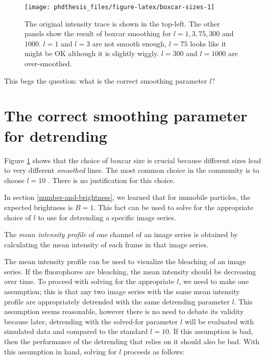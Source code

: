 \documentclass[12pt,]{book}
\theoremstyle{definition}
\theoremstyle{definition}
\theoremstyle{definition}
\theoremstyle{remark}
\let\BeginKnitrBlock\begin \let\EndKnitrBlock\end
\begin{document}
\begin{figure}

\texttt{[image: phdthesis\_files/figure-latex/boxcar-sizes-1]} \hfill{}

\caption{The original intensity trace is shown in the
top-left. The other panels show the result of boxcar smoothing for
\(l = 1, 3, 75, 300\) and \(1000\). \(l=1\) and \(l=3\) are not smooth
enough, \(l = 75\) looks like it might be OK although it is slightly
wiggly. \(l = 300\) and \(l = 1000\) are over-smoothed.}\label{fig:boxcar-sizes}
\end{figure}

This begs the question: what is the correct smoothing parameter \(l\)?

\section{The correct smoothing parameter for
detrending}\label{the-correct-smoothing-parameter-for-detrending}

Figure \ref{fig:boxcar-sizes} shows that the choice of boxcar size is
crucial because different sizes lead to very different \emph{smoothed}
lines. The most common choice in the community is to choose \(l = 10\)
\citep{SimFCS}. There is no justification for this choice.

In section \ref{number-and-brightness}, we learned that for immobile
particles, the expected brightness is \(B = 1\). This fact can be used
to solve for the appropriate choice of \(l\) to use for detrending a
specific image series.

\BeginKnitrBlock{definition}
\protect\hypertarget{def:unnamed-chunk-34}{}{\label{def:unnamed-chunk-34}
}The \emph{mean intensity profile} of one channel of an image series is
obtained by calculating the mean intensity of each frame in that image
series.
\EndKnitrBlock{definition}

The mean intensity profile can be used to visualize the bleaching of an
image series. If the fluorophores are bleaching, the mean intensity
should be decreasing over time. To proceed with solving for the
appropriate \(l\), we need to make one assumption; this is that any two
image series with the same mean intensity profile are appropriately
detrended with the same detrending parameter \(l\). This assumption
seems reasonable, however there is no need to debate its validity
because later, detrending with the solved-for parameter \(l\) will be
evaluated with simulated data and compared to the standard \(l = 10\).
If this assumption is bad, then the performance of the detrending that
relies on it should also be bad. With this assumption in hand, solving
for \(l\) proceeds as follows:
\end{document}

